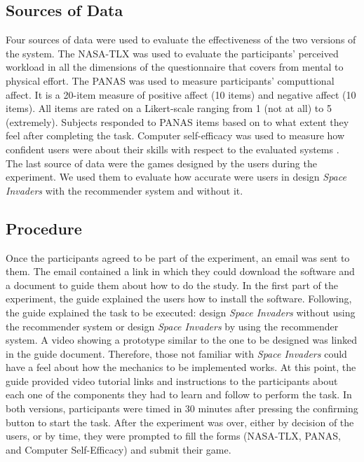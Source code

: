 \documentclass[letterpaper]{article} %
\begin{document}
\subsection{Sources of Data}
Four sources of data were used to evaluate the effectiveness of the two versions of the system. The NASA-TLX \cite{hart1988development} was used to evaluate the participants' perceived workload in all the dimensions of the questionnaire that covers from mental to physical effort. The PANAS \cite{crawford2004positive} was used to measure participants' computtional affect. It is a 20-item measure of positive affect (10 items) and negative affect (10 items). All items are rated on a Likert-scale ranging from 1 (not at all) to 5 (extremely). Subjects responded to PANAS items based on to what extent they feel after completing the task. Computer self-efficacy was used to measure how confident users were about their skills with respect to the evaluated systems \cite{marakas1998multilevel}. The last source of data were the games designed by the users during the experiment. We used them to evaluate how accurate were users in design \textit{Space Invaders} with the recommender system and without it.

\subsection{Procedure}
Once the participants agreed to be part of the experiment, an email was sent to them. The email contained a link in which they could download the software and a document to guide them about how to do the study. In the first part of the experiment, the guide explained the users how to install the software. Following, the guide explained the task to be executed: design \textit{Space Invaders} without using the recommender system or design \textit{Space Invaders} by using the recommender system. A video showing a prototype similar to the one to be designed was linked in the guide document. Therefore, those not familiar with \textit{Space Invaders} could have a feel about how the mechanics to be implemented works.
At this point, the guide provided video tutorial links and instructions to the participants about each one of the components they had to learn and follow to perform the task. In both versions, participants were timed in 30 minutes after pressing the confirming button to start the task.
After the experiment was over, either by decision of the users, or by time, they were prompted to fill the forms (NASA-TLX, PANAS, and Computer Self-Efficacy) and submit their game.
\end{document}
